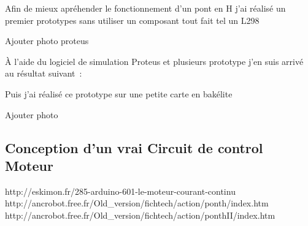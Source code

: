 \documentclass[10pt,a4paper]{article}
\begin{document}
Afin de mieux apréhender le fonctionnement d'un pont en H j'ai réalisé un premier prototypes sans
utiliser un composant tout fait tel un L298

Ajouter photo proteus

À l'aide du logiciel de simulation Proteus et plusieurs prototype j'en suis arrivé au résultat
suivant : 

Puis j'ai réalisé ce prototype sur une petite carte en bakélite

Ajouter photo

\subsection{Conception d'un vrai Circuit de control Moteur}

\cite{MoteurCCEskimon}



http://eskimon.fr/285-arduino-601-le-moteur-courant-continu
http://ancrobot.free.fr/Old_version/fichtech/action/ponth/index.htm
http://ancrobot.free.fr/Old_version/fichtech/action/ponthII/index.htm
\end{document}
